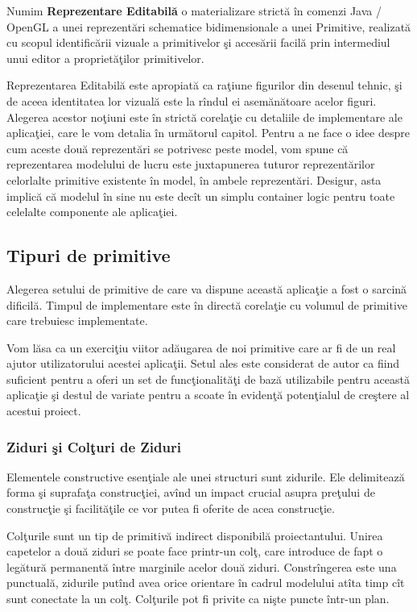 \begin{definition}
\label{define:editorRender}
Numim \textbf{Reprezentare Editabilă} o materializare strictă în comenzi 
Java / OpenGL a unei reprezentări schematice bidimensionale a unei Primitive, 
realizată cu scopul identificării vizuale a primitivelor şi accesării facilă 
prin intermediul unui editor a proprietăţilor primitivelor.
\end{definition}

Reprezentarea Editabilă este apropiată ca raţiune figurilor din desenul tehnic, 
şi de aceea identitatea lor vizuală este la rîndul ei asemănătoare acelor 
figuri. Alegerea acestor noţiuni este în strictă corelaţie cu detaliile de 
implementare ale aplicaţiei, care le vom detalia în următorul capitol. Pentru a 
ne face o idee despre cum aceste două reprezentări se potrivesc peste model, 
vom spune că reprezentarea modelului de lucru este juxtapunerea tuturor 
reprezentărilor celorlalte primitive existente în model, în ambele 
reprezentări. Desigur, asta implică că modelul în sine nu este decît un simplu 
container logic pentru toate celelalte componente ale aplicaţiei.

\subsection{Tipuri de primitive}
\label{section:primitives}
Alegerea setului de primitive de care va dispune această aplicaţie a fost o 
sarcină dificilă. Timpul de implementare este în directă corelaţie cu volumul 
de primitive care trebuiesc implementate.

Vom lăsa ca un exerciţiu viitor adăugarea de noi primitive care ar fi de un 
real ajutor utilizatorului acestei aplicaţii. Setul ales este considerat de 
autor ca fiind suficient pentru a oferi un set de funcţionalităţi de bază 
utilizabile pentru această aplicaţie şi destul de variate pentru a scoate în 
evidenţă potenţialul de creştere al acestui proiect.

\subsubsection{Ziduri şi Colţuri de Ziduri}

Elementele constructive esenţiale ale unei structuri sunt zidurile. Ele 
delimitează forma şi suprafaţa construcţiei, avînd un impact crucial asupra 
preţului de construcţie şi facilităţile ce vor putea fi oferite de acea 
construcţie.

Colţurile sunt un tip de primitivă indirect disponibilă proiectantului. Unirea 
capetelor a două ziduri se poate face printr-un colţ, care introduce de fapt o 
legătură permanentă între marginile acelor două ziduri. Constrîngerea este una 
punctuală, zidurile putînd avea orice orientare în cadrul modelului atîta timp 
cît sunt conectate la un colţ. Colţurile pot fi privite ca nişte puncte într-un 
plan.

